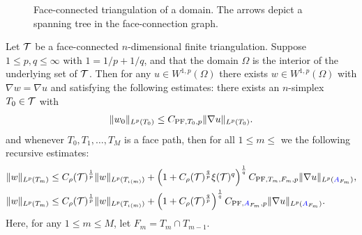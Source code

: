 \documentclass[10pt,a4paper]{article}
\begin{document}
\begin{figure}[t]
\begin{center}
\begin{tikzpicture}[rotate=-60]
\end{tikzpicture}
\end{center}
\caption{Face-connected triangulation of a domain. The arrows depict a spanning tree in the face-connection graph.}
\label{figure:spanningtree}
\end{figure}


\begin{theorem}\label{theorem:poincarefriedrichsestimate:grad}
    Let $\calT$ be a face-connected $n$-dimensional finite triangulation. 
    Suppose $1 \leq p,q \leq \infty$ with $1 = 1/p + 1/q$,
    and that the domain $\Omega$ is the interior of the underlying set of $\calT$. 
    Then for any $u \in W^{1,p}(\Omega)$ 
    there exists $w \in W^{1,p}(\Omega)$ with $\nabla w = \nabla u$ 
    and satisfying the following estimates:
    there exists an $n$-simplex $T_0 \in \calT$ with 
    \begin{gather*}
        \| w_0 \|_{L^{p}(T_{0})} \leq C_{{\PF},T_{0},p} \| \nabla u \|_{L^{p}(T_{0})}.
    \end{gather*}
    and whenever $T_0, T_1, \dots, T_M$ is a face path,
    then for all $1 \leq m \leq$ we the following recursive estimates:
    \begin{align*}
        \| w \|_{L^{p}(T_{m})}
        &
        \leq  
        \volumeratio(\calT)^{\frac 1 p} 
        \| w \|_{L^{p}(T_{\iota(m)})} 
        + 
        \left( 1 + \volumeratio(\calT)^{\frac q p} \xi(\calT)^{q} \right)^{\frac 1 q}
        C_{\PF,T_{m},F_{m},p} 
        \| \nabla u \|_{L^{p}(\Minako_{F_m})} 
        ,
        \\
        \| w \|_{L^{p}(T_m)}
        &\leq 
        \volumeratio(\calT)^{\frac 1 p} 
        \| w \|_{L^{p}(T_{{\iota(m)}})}
        +
        \left( 1 + \volumeratio(\calT)^{\frac q p} \right)^{\frac 1 q}
        C_{{\PF},\Minako_{F_m},p} 
        \| \nabla u \|_{L^{p}(\Minako_{F_m})} 
        . 
    \end{align*}
    Here, for any $1 \leq m \leq M$, let $F_m = T_m \cap T_{m-1}$.
\end{theorem}
\end{document}
